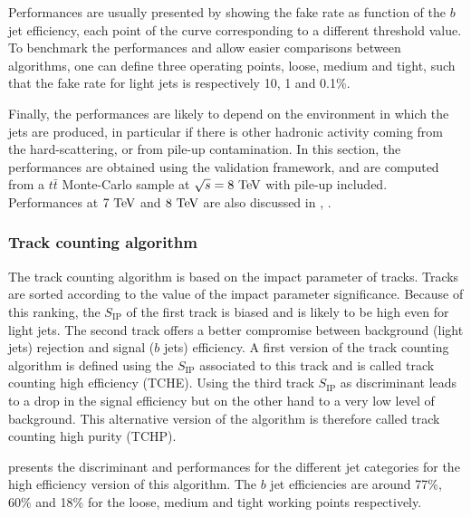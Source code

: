     Performances are usually presented by showing the fake rate as function
    of the $b$ jet efficiency, each point of the curve corresponding to a different threshold
    value. To benchmark the performances and allow easier comparisons
    between algorithms, one can define three operating points, loose, medium and tight,
    such that the fake rate for light jets is respectively 10, 1 and 0.1\%.

    Finally, the performances are likely to depend on the environment in which
    the jets are produced, in particular if there is other hadronic activity coming from
    the hard-scattering, or from pile-up contamination. In this section, the performances
    are obtained using the validation framework, and are computed from a $t\bar{t}$
    Monte-Carlo sample at $\sqrt{s} = 8~\text{TeV}$ with pile-up included. Performances at $7~\text{TeV}$
    and $8~\text{TeV}$ are also discussed in \cite{BTagging7TeV}, \cite{BTagging8TeV}.

        \subsubsection{Track counting algorithm}

    The track counting algorithm is based on the impact parameter of tracks. Tracks are
    sorted according to the value of the impact parameter significance. Because of this
    ranking, the $S_\text{IP}$ of the first track is biased and is likely to be high even
    for light jets. The second track offers a better compromise between background (light
    jets) rejection and signal ($b$ jets) efficiency. A first version of the track counting
    algorithm is defined using the $S_\text{IP}$ associated to this track and is called track
    counting high efficiency (TCHE). Using the third track $S_\text{IP}$ as discriminant
    leads to a drop in the signal efficiency but on the other hand to a very low level of
    background. This alternative version of the algorithm is therefore called track counting high
    purity (TCHP).

     presents the discriminant and
    performances for the different jet categories for the high efficiency version of this
    algorithm. The $b$ jet efficiencies are around 77\%, 60\% and 18\% for the loose, medium
    and tight working points respectively.

